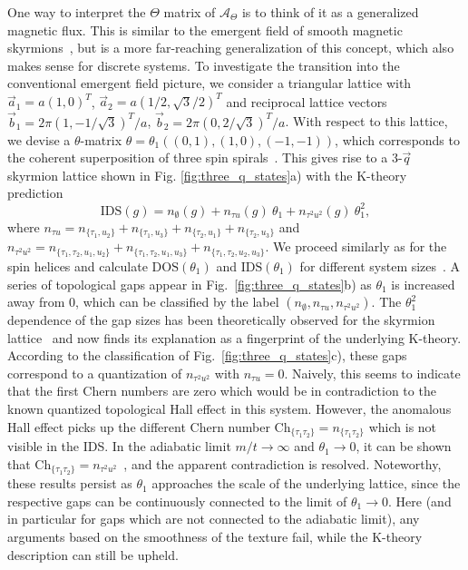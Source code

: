\documentclass[
    aps,
    prl,
    twocolumn,
    floatfix,
    superscriptaddress
]{revtex4-2}
\newcommand{\SupplementalMaterial}{\cite{Note1}}
\begin{document}

One way to interpret the $\Theta$ matrix of $\mathcal{A}_\Theta$ is to think of it as a generalized magnetic flux.
This is similar to the emergent field of smooth magnetic skyrmions~\cite{Bliokh2005, Schulz2012}, but is a more far-reaching generalization of this concept, which also makes sense for discrete systems.
To investigate the transition into the conventional emergent field picture, we consider a triangular lattice with $\vec{a}_1 = a (1,0)^T$, $\vec{a}_2 = a (1/2,\sqrt{3}/2 )^T$ and reciprocal lattice vectors
$\vec{b}_1 = 2 \pi (1, -1/\sqrt{3})^T / a$, $	\vec{b}_2 = 2 \pi (0, 2 / \sqrt{3})^T / a$.
With respect to this lattice, we devise a $\theta$-matrix
$ \theta = \theta_1 (( 
	0, 1),
	(  1,0 ),
	( -1,-1 )) $,
which corresponds to the coherent superposition of three spin spirals~\SupplementalMaterial. 
This gives rise to a 3-$\vec{q}$ skyrmion lattice shown in Fig. \ref{fig:three_q_states}a) with the K-theory prediction
\begin{equation}
     \mathrm{IDS}(g) = n_\emptyset(g) + n_{\tau u}(g)~\theta_1 + n_{\tau^2u^2}(g)~\theta_1^2,
    \label{eq:k_prediction_skx}
\end{equation}
where $n_{\tau u} = n_{ \lbrace \tau_1 , u_2\rbrace} + n_{\lbrace\tau_1 , u_3\rbrace}+n_{\lbrace\tau_2 , u_1\rbrace}+n_{\lbrace\tau_2 , u_3\rbrace}$ and $n_{\tau^2u^2} = n_{\lbrace\tau_1, \tau_2 , u_1 , u_2\rbrace} +  n_{\lbrace\tau_1 , \tau_2 ,  u_1 ,  u_3\rbrace} + n_{\lbrace\tau_1 , \tau_2 ,  u_2  , u_3 \rbrace}$.
We proceed similarly as for the spin helices and calculate $\mathrm{DOS}(\theta_1)$ and $\mathrm{IDS}(\theta_1)$ for different system sizes~\SupplementalMaterial.
A series of topological gaps appear in Fig.~\ref{fig:three_q_states}b) as $\theta_1$ is increased away from $0$, which can be classified by the label $(n_\emptyset, n_{\tau u}, n_{\tau^2u^2})$.
The $\theta_1^2$ dependence of the gap sizes  has been theoretically observed for the skyrmion lattice~\cite{Hamamoto2015} and now finds its explanation as a fingerprint of the underlying K-theory.
According to the classification of Fig.~\ref{fig:three_q_states}c), 
these gaps correspond to a quantization of $n_{\tau^2u^2}$ with $n_{\tau u}=0$.
Naively, this seems to indicate that the first Chern numbers are zero which would be in contradiction to the known quantized topological Hall effect in this system.
However, the anomalous Hall effect picks up the different Chern number $\mathrm{Ch}_{ \lbrace \tau_1 \tau_2 \rbrace } = n_{ \lbrace \tau_1 \tau_2 \rbrace }$ \cite{Prodan2017} which is not visible in the IDS.
In the adiabatic limit $m/t \to \infty$ and $\theta_1 \to 0$, it can be shown that $\mathrm{Ch}_{ \lbrace \tau_1 \tau_2 \rbrace } = n_{\tau^2u^2}$~\SupplementalMaterial, and the apparent contradiction is resolved.
Noteworthy, these results persist as $\theta_1$ approaches the scale of the underlying lattice, since the respective gaps can be continuously connected to the limit of $\theta_1 \to 0$.
Here (and in particular for gaps which are not connected to the adiabatic limit), any arguments based on the smoothness of the texture fail, while the K-theory description can still be upheld.
\end{document}
